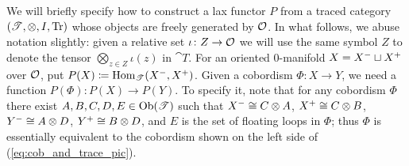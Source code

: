 \documentclass[11pt,oneside,article]{memoir}
\begin{document}
We will briefly specify how to construct a lax functor $P$ from a traced category
$(\mathscr{T},\otimes,I,\operatorname{Tr})$ whose objects are freely generated by $\mathcal{O}$. In what follows, we abuse
notation slightly: given a relative set $\iota\colon Z\to\mathcal{O}$ we will use the same symbol $Z$ to
denote the tensor $\bigotimes_{z\in Z}\iota(z)$ in $\cat{T}$. For an oriented 0-manifold
$X=X^-\sqcup X^+$ over $\mathcal{O}$, put $P(X)\coloneqq\operatorname{Hom}_{\mathscr{T}}(X^-,X^+)$.
Given a cobordism $\Phi\colon X\to Y$, we need a function $P(\Phi)\colon P(X)\to P(Y)$. To specify
it, note that for any cobordism $\Phi$ there exist $A,B,C,D,E\in\mathrm{Ob}(\mathscr{T})$ such that
$X^-\cong C\otimes A$, $X^+\cong C\otimes B$, $Y^-\cong A\otimes D$, $Y^+\cong
B\otimes D$, and $E$ is the set of floating loops in $\Phi$; thus $\Phi$ is essentially equivalent
to the cobordism shown on the left side of (\ref{eq:cob_and_trace_pic}).
\end{document}
